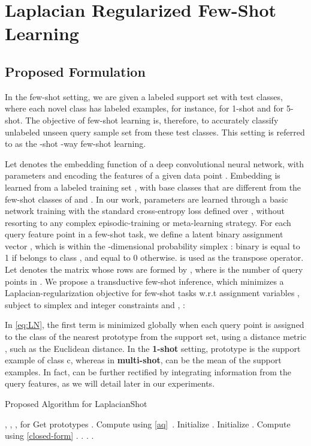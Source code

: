 \documentclass{article}
\begin{document}
\section{Laplacian Regularized Few-Shot Learning}
\subsection{Proposed Formulation}
In the few-shot setting, we are given a labeled support set  with  test classes, where each novel class  has  labeled examples, for instance,  for 1-shot and  for 5-shot. The objective of few-shot learning is, therefore, to accurately classify unlabeled unseen query sample set  from these  test classes. This setting is referred to as the -shot -way few-shot learning.

Let  denotes the embedding function of a deep convolutional neural network, with parameters  and  encoding the features of a given data point . Embedding  is learned from a labeled training set , with  
base classes
that are different from 
the few-shot classes of  and .
In our work, parameters  are learned through a basic network training with the standard cross-entropy loss defined over , without resorting to any complex episodic-training or meta-learning strategy. For each query feature point  in a few-shot task, we define a latent binary assignment vector , which is within the -dimensional probability simplex : binary  is equal to 1 if  belongs to class , and equal to 0 otherwise.  is used as the transpose operator. Let  denotes the  matrix whose rows are formed by , where  is the number of query points in . We propose a transductive few-shot inference, which minimizes a Laplacian-regularization objective for few-shot tasks w.r.t assignment variables , subject to simplex and integer constraints  and , :  

In \eqref{eq:LN}, the first term  is minimized globally when each query point is assigned to the class of the nearest prototype  from the support set, using a distance metric , such as the Euclidean distance. In the \textbf{1-shot} setting, prototype  is the support example of class c, whereas in \textbf{multi-shot},  can be the  mean of the support examples. In fact,  can be further rectified 
by integrating information from the query features, as we will detail later in our experiments. 
\begin{algorithm}[tb]
  \caption{Proposed Algorithm for LaplacianShot}
  \label{alg}
\begin{algorithmic}
   , , , 
    for 
  \STATE Get prototypes .
  \STATE Compute  using \eqref{aq}~.
  \STATE Initialize .
  \STATE Initialize .
  \REPEAT
  \STATE Compute  using \eqref{closed-form}
  \STATE .
  \STATE .
  \STATE .
  \STATE .
  \STATE 
\end{algorithmic}
\end{algorithm}
\end{document}
